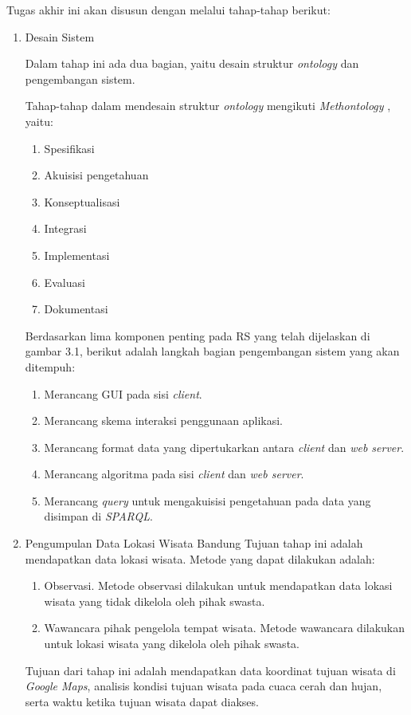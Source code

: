 Tugas akhir ini akan disusun dengan melalui tahap-tahap berikut:
\begin{enumerate}

\item Desain Sistem
\par
Dalam tahap ini ada dua bagian, yaitu desain struktur \textit{ontology} dan pengembangan sistem.
\par
Tahap-tahap dalam mendesain struktur \textit{ontology} mengikuti \textit{Methontology} \cite{jones1998methodologies}, yaitu:
\begin{enumerate}
	\item Spesifikasi
	\item Akuisisi pengetahuan
	\item Konseptualisasi
	\item Integrasi
	\item Implementasi
	\item Evaluasi
	\item Dokumentasi
\end{enumerate} 
Berdasarkan lima komponen penting pada RS yang telah dijelaskan di gambar 3.1, berikut adalah langkah bagian pengembangan sistem yang akan ditempuh:
\begin{enumerate}
	\item Merancang GUI pada sisi \textit{client}.
	\item Merancang skema interaksi penggunaan aplikasi.
	\item Merancang format data yang dipertukarkan antara \textit{client} dan \textit{web server}.
	\item Merancang algoritma pada sisi \textit{client} dan \textit{web server}.
	\item Merancang \textit{query} untuk mengakuisisi pengetahuan pada data yang disimpan di \textit{SPARQL}.
\end{enumerate}

\item Pengumpulan Data Lokasi Wisata Bandung
\newline
Tujuan tahap ini adalah mendapatkan data lokasi wisata. Metode yang dapat dilakukan adalah:
\begin{enumerate}
	\item Observasi.
	Metode observasi dilakukan untuk mendapatkan data lokasi wisata yang tidak dikelola oleh pihak swasta.
	\item Wawancara pihak pengelola tempat wisata.
	Metode wawancara dilakukan untuk lokasi wisata yang dikelola oleh pihak swasta.
\end{enumerate}
\par
Tujuan dari tahap ini adalah mendapatkan data koordinat tujuan wisata di \textit{Google Maps}, analisis kondisi tujuan wisata pada cuaca cerah dan hujan, serta waktu ketika tujuan wisata dapat diakses.


\end{enumerate}
